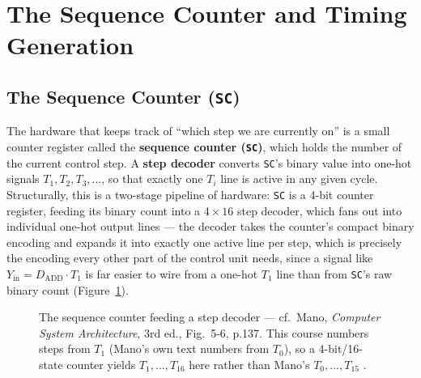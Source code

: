 \documentclass[11pt]{article}
\begin{document}
\section{The Sequence Counter and Timing Generation}
\label{sec:sc}

\subsection{The Sequence Counter (\texttt{SC})}

The hardware that keeps track of ``which step we are currently on'' is a small counter register called the \textbf{sequence counter (\texttt{SC})}, which holds the number of the current control step. A \textbf{step decoder} converts \texttt{SC}'s binary value into one-hot signals $T_1, T_2, T_3, \dots$, so that exactly one $T_i$ line is active in any given cycle. Structurally, this is a two-stage pipeline of hardware: \texttt{SC} is a 4-bit counter register, feeding its binary count into a $4{\times}16$ step decoder, which fans out into individual one-hot output lines --- the decoder takes the counter's compact binary encoding and expands it into exactly one active line per step, which is precisely the encoding every other part of the control unit needs, since a signal like $Y_{\text{in}} = D_{\text{ADD}} \cdot T_1$ is far easier to wire from a one-hot $T_1$ line than from \texttt{SC}'s raw binary count (Figure~\ref{fig:sc}).

\begin{figure}[h]
  \centering
  \caption{The sequence counter feeding a step decoder --- cf.\ Mano, \textit{Computer System Architecture}, 3rd ed., Fig.~5-6, p.137. This course numbers steps from $T_1$ (Mano's own text numbers from $T_0$), so a 4-bit/16-state counter yields $T_1, \dots, T_{16}$ here rather than Mano's $T_0, \dots, T_{15}$ \cite{Mano1993_computer_system_architecture}.}
  \label{fig:sc}
\end{figure}
\end{document}
